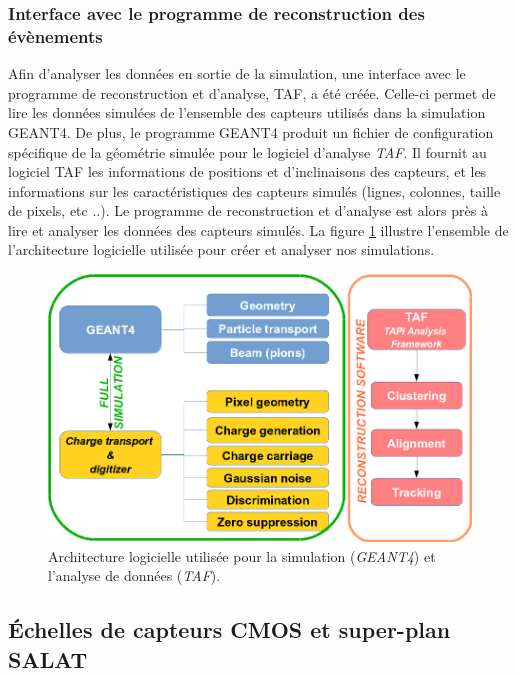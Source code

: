   \subsubsection{Interface avec le programme de reconstruction des \'ev\`enements}
  
   Afin d'analyser les donn\'ees en sortie de la simulation, une interface avec le programme de reconstruction et d'analyse, TAF, a \'et\'e cr\'e\'ee. Celle-ci permet de lire les donn\'ees simul\'ees de l'ensemble des capteurs utilis\'es dans la simulation GEANT4. De plus, le programme GEANT4 produit un fichier de configuration sp\'ecifique de la g\'eom\'etrie simul\'ee pour le logiciel d'analyse \textit{TAF}. Il fournit au logiciel TAF les informations de positions et d'inclinaisons des capteurs, et les informations sur les caract\'eristiques des capteurs simul\'es (lignes, colonnes, taille de pixels, etc ..).  Le programme de reconstruction et d'analyse est alors pr\`es à lire et analyser les donn\'ees des capteurs simul\'es. La figure \ref{fig:softs} illustre l'ensemble de l'architecture logicielle utilis\'ee pour cr\'eer et analyser nos simulations.

   \begin{figure}[!htb]
     \begin{center} 
      \includegraphics[scale=0.5]{./figures/Schema_framework_software.png}
      \caption{Architecture logicielle utilis\'ee pour la simulation (\textit{GEANT4}) et l'analyse de donn\'ees (\textit{TAF}).}
      \label{fig:softs}
     \end{center}
   \end{figure}
   
  \subsection{\'Echelles de capteurs CMOS et super-plan SALAT}
   
